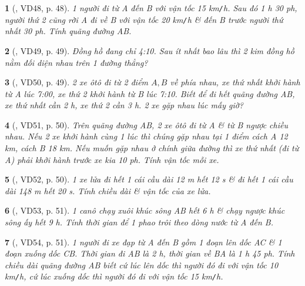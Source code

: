\documentclass{article}
\newtheorem{baitoan}{}
\begin{document}
\begin{baitoan}[\cite{Binh_Toan_6_tap_2}, VD48, p. 48]
	1 người đi từ A đến B với vận tốc {\rm15 km{\tt/}h}. Sau đó {\rm1 h 30 ph}, người thứ 2 cũng rời A đi về B với vận tốc {\rm20 km{\tt/}h} \& đến B trước người thứ nhất {\rm30 ph}. Tính quãng đường AB.
\end{baitoan}

\begin{baitoan}[\cite{Binh_Toan_6_tap_2}, VD49, p. 49]
	Đồng hồ đang chỉ {\rm4:10}. Sau ít nhất bao lâu thì 2 kim đồng hồ nằm đối diện nhau trên 1 đường thẳng?
\end{baitoan}

\begin{baitoan}[\cite{Binh_Toan_6_tap_2}, VD50, p. 49]
	2 xe ôtô đi từ 2 điểm $A,B$ về phía nhau, xe thứ nhất khởi hành từ A lúc {\rm7:00}, xe thứ 2 khởi hành từ B lúc {\rm7:10}. Biết để đi hết quãng đường AB, xe thứ nhất cần {\rm2 h}, xe thứ 2 cần {\rm3 h}. 2 xe gặp nhau lúc mấy giờ?
\end{baitoan}

\begin{baitoan}[\cite{Binh_Toan_6_tap_2}, VD51, p. 50]
	Trên quãng đường AB, 2 xe ôtô đi từ A \& từ B ngược chiều nhau. Nếu 2 xe khởi hành cùng 1 lúc thì chúng gặp nhau tại 1 điểm cách A {\rm12 km}, cách B {\rm18 km}. Nếu muốn gặp nhau ở chính giữa đường thì xe thứ nhất (đi từ A) phải khởi hành trước xe kia {\rm10 ph}. Tính vận tốc mỗi xe.
\end{baitoan}

\begin{baitoan}[\cite{Binh_Toan_6_tap_2}, VD52, p. 50]
	1 xe lửa đi hết 1 cái cầu dài {\rm12 m} hết {\rm12 s} \& đi hết 1 cái cầu dài {\rm148 m} hết {\rm20 s}. Tính chiều dài \& vận tốc của xe lửa.
\end{baitoan}

\begin{baitoan}[\cite{Binh_Toan_6_tap_2}, VD53, p. 51]
	1 canô chạy xuôi khúc sông AB hết {\rm6 h} \& chạy ngược khúc sông ấy hết {\rm9 h}. Tính thời gian để 1 phao trôi theo dòng nước từ A đến B.
\end{baitoan}

\begin{baitoan}[\cite{Binh_Toan_6_tap_2}, VD54, p. 51]
	1 người đi xe đạp từ A đến B gồm 1 đoạn lên dốc AC \& 1 đoạn xuống dốc CB. Thời gian đi AB là {\rm2 h}, thời gian về BA là {\rm1 h 45 ph}. Tính chiều dài quãng đường AB biết cứ lúc lên dốc thì người đó đi với vận tốc {\rm10 km{\tt/}h}, cứ lúc xuống dốc thì người đó đi với vận tốc {\rm15 km{\tt/}h}.
\end{baitoan}
\end{document}

